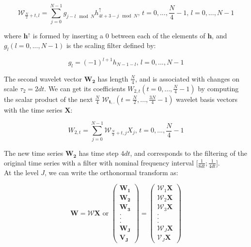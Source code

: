 \documentclass[main.tex]{subfiles}
\begin{document}
\begin{equation}
\mathcal{W}_{\frac{N}{2} + t , l} = \sum_{j = 0}^{N - 1} g_{j - l \mod N} h_{4 t + 3 - j \mod N}^{\uparrow} \text{, } t = 0 , ... , \frac{N}{4} - 1 \text{, } l = 0 , ... , N - 1
\end{equation}

where $\bm{h^{\uparrow}}$ is formed by inserting a $0$ between each of the elements of $\bm{h}$, and $g_l \left( l = 0 , ... , N - 1 \right)$ is the scaling filter defined by:

\begin{equation}
g_l = \left( - 1 \right) ^{l + 1} h_{N - 1 - l} \text{, } l = 0 , ... , N - 1
\end{equation}

The second wavelet vector $\bm{W_2}$ has length $\frac{N}{4}$, and is associated with changes on scale $\tau_2 = 2 dt$. We can get its coefficients $W_{2 , t} \left( t = 0 , ... , \frac{N}{4} - 1 \right)$ by computing the scalar product of the next $\frac{N}{4}$ $\bm{\mathcal{W}_{t , .}} \left( t = \frac{N}{2} , ... , \frac{3 N}{4} - 1 \right)$ wavelet basis vectors with the time series $\bm{X}$:

\begin{equation}
W_{2 , t} = \sum_{j = 0}^{N - 1} \mathcal{W}_{\frac{N}{2} + t , j} X_j \text{, } t = 0 , ... , \frac{N}{4} - 1
\end{equation}

The new time series $\bm{W_2}$ has time step $4 dt$, and corresponds to the filtering of the original time series with a filter with nominal frequency interval $\lbrack \frac{1}{8 dt} ; \frac{1}{4 dt} \rbrack$. \\

At the level $J$, we can write the orthonormal transform as:

\begin{equation}
\bm{W} = \mathcal{W} \bm{X} \text{ or } \begin{pmatrix} \bm{W_1} \\ \bm{W_2} \\ \bm{W_3} \\ . \\ . \\ . \\ \bm{W_J} \\ \bm{V_J} \end{pmatrix}
= \begin{pmatrix} \mathcal{W}_1 \bm{X} \\ \mathcal{W}_2 \bm{X} \\ \mathcal{W}_3 \bm{X} \\ . \\ . \\ . \\ \mathcal{W}_J \bm{X} \\ \mathcal{V}_J \bm{X} \end{pmatrix}
\end{equation}
\end{document}
